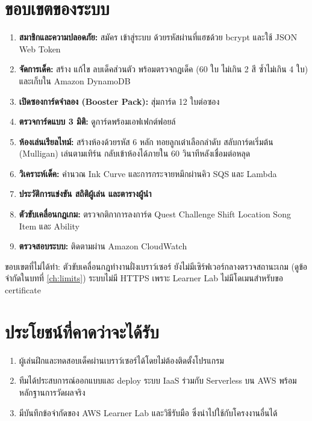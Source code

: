 \section{ขอบเขตของระบบ}

\begin{enumerate}
    \item \textbf{สมาชิกและความปลอดภัย:} สมัคร เข้าสู่ระบบ ด้วยรหัสผ่านที่แฮชด้วย bcrypt และใช้ JSON Web Token
    \item \textbf{จัดการเด็ค:} สร้าง แก้ไข ลบเด็คส่วนตัว พร้อมตรวจกฎเด็ค (60 ใบ ไม่เกิน 2 สี ซ้ำไม่เกิน 4 ใบ) และเก็บใน Amazon DynamoDB
    \item \textbf{เปิดซองการ์ดจำลอง (Booster Pack):} สุ่มการ์ด 12 ใบต่อซอง
    \item \textbf{ตรวจการ์ดแบบ 3 มิติ:} ดูการ์ดพร้อมเอฟเฟกต์ฟอยล์
    \item \textbf{ห้องเล่นเรียลไทม์:} สร้างห้องด้วยรหัส 6 หลัก ทอยลูกเต๋าเลือกลำดับ สลับการ์ดเริ่มต้น (Mulligan) เล่นตามเทิร์น กลับเข้าห้องได้ภายใน 60 วินาทีหลังเชื่อมต่อหลุด
    \item \textbf{วิเคราะห์เด็ค:} คำนวณ Ink Curve และการกระจายหมึกผ่านคิว SQS และ Lambda
    \item \textbf{ประวัติการแข่งขัน สถิติผู้เล่น และตารางผู้นำ}
    \item \textbf{ตัวขับเคลื่อนกฎเกม:} ตรวจกติกาการลงการ์ด Quest Challenge Shift Location Song Item และ Ability
    \item \textbf{ตรวจสอบระบบ:} ติดตามผ่าน Amazon CloudWatch
\end{enumerate}

ขอบเขตที่ไม่ได้ทำ: ตัวขับเคลื่อนกฎทำงานฝั่งเบราว์เซอร์ ยังไม่มีเซิร์ฟเวอร์กลางตรวจสถานะเกม (ดูข้อจำกัดในบทที่ \ref{ch:limits}) ระบบไม่มี HTTPS เพราะ Learner Lab ไม่มีโดเมนสำหรับขอ certificate

\section{ประโยชน์ที่คาดว่าจะได้รับ}

\begin{enumerate}
    \item ผู้เล่นฝึกและทดสอบเด็คผ่านเบราว์เซอร์ได้โดยไม่ต้องติดตั้งโปรแกรม
    \item ทีมได้ประสบการณ์ออกแบบและ deploy ระบบ IaaS ร่วมกับ Serverless บน AWS พร้อมหลักฐานการวัดผลจริง
    \item มีบันทึกข้อจำกัดของ AWS Learner Lab และวิธีรับมือ ซึ่งนำไปใช้กับโครงงานอื่นได้
\end{enumerate}

